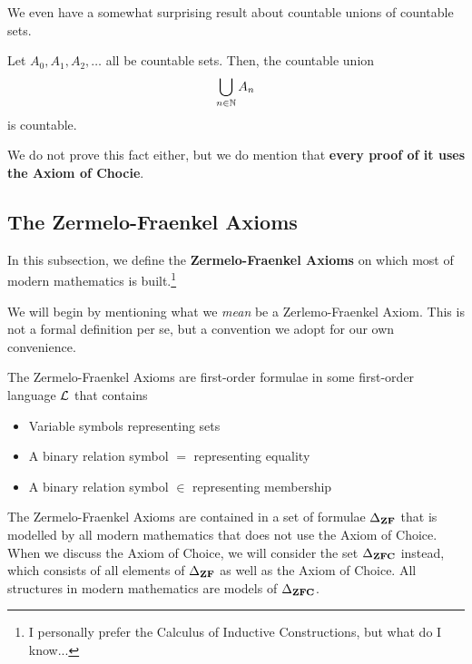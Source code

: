 We even have a somewhat surprising result about countable unions of countable sets.

\begin{boxproposition}
    Let $A_0, A_1, A_2, \ldots$ all be countable sets. Then, the countable union
    \begin{align*}
        \bigcup_{n \in \mathbb{N}} A_n
    \end{align*}
    is countable.
\end{boxproposition}

We do not prove this fact either, but we do mention that \textbf{every proof of it uses the Axiom of Chocie}.

\begin{boxexample}
    
\end{boxexample}




\subsection{The Zermelo-Fraenkel Axioms}

In this subsection, we define the \textbf{Zermelo-Fraenkel Axioms} on which most of modern mathematics is built.\footnote{I personally prefer the Calculus of Inductive Constructions, but what do I know...}

We will begin by mentioning what we \textit{mean} be a Zerlemo-Fraenkel Axiom. This is not a formal definition per se, but a convention we adopt for our own convenience.

\begin{boxconvention}
    The Zermelo-Fraenkel Axioms are first-order formulae in some first-order language $\mathcal{L}$ that contains
    \begin{itemize}
        \item Variable symbols representing sets
        \item A binary relation symbol $=$ representing equality
        \item A binary relation symbol $\in$ representing membership
    \end{itemize}
    The Zermelo-Fraenkel Axioms are contained in a set of formulae $\Delta_{\mathbf{ZF}}$ that is modelled by all modern mathematics that does not use the Axiom of Choice. When we discuss the Axiom of Choice, we will consider the set $\Delta_{\mathbf{ZFC}}$ instead, which consists of all elements of $\Delta_{\mathbf{ZF}}$ as well as the Axiom of Choice. All structures in modern mathematics are models of $\Delta_{\mathbf{ZFC}}$.
\end{boxconvention}

